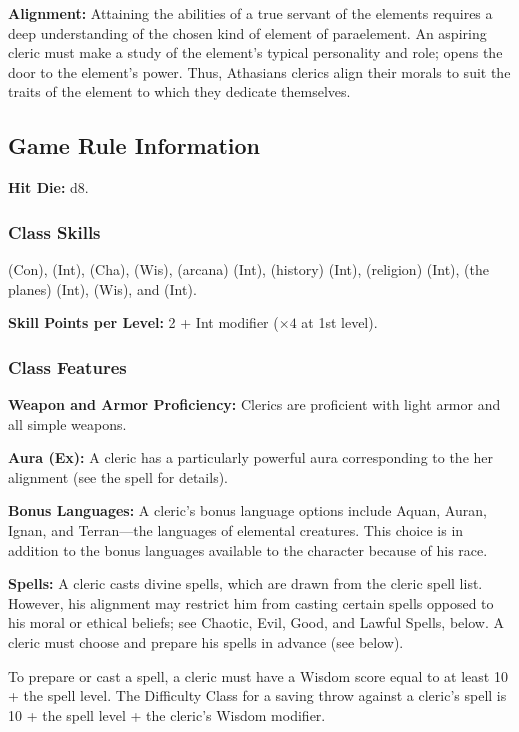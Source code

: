 \textbf{Alignment:} Attaining the abilities of a true servant of the elements requires a deep understanding of the chosen kind of element of paraelement. An aspiring cleric must make a study of the element's typical personality and role; opens the door to the element's power. Thus, Athasians clerics align their morals to suit the traits of the element to which they dedicate themselves.

\subsection{Game Rule Information}

\textbf{Hit Die:} d8.

\subsubsection{Class Skills}
 (Con),  (Int),  (Cha),  (Wis),  (arcana) (Int),  (history) (Int),  (religion) (Int),  (the planes) (Int),  (Wis), and  (Int).

\textbf{Skill Points per Level:} 2 + Int modifier ($\times4$ at 1st level).

\subsubsection{Class Features}
\textbf{Weapon and Armor Proficiency:} Clerics are proficient with light armor and all simple weapons.

\textbf{Aura (Ex):} A cleric has a particularly powerful aura corresponding to the her alignment (see the  spell for details).

\textbf{Bonus Languages:} A cleric's bonus language options include Aquan, Auran, Ignan, and Terran---the languages of elemental creatures. This choice is in addition to the bonus languages available to the character because of his race.

\textbf{Spells:} A cleric casts divine spells, which are drawn from the cleric spell list. However, his alignment may restrict him from casting certain spells opposed to his moral or ethical beliefs; see Chaotic, Evil, Good, and Lawful Spells, below. A cleric must choose and prepare his spells in advance (see below).

To prepare or cast a spell, a cleric must have a Wisdom score equal to at least 10 + the spell level. The Difficulty Class for a saving throw against a cleric's spell is 10 + the spell level + the cleric's Wisdom modifier.


